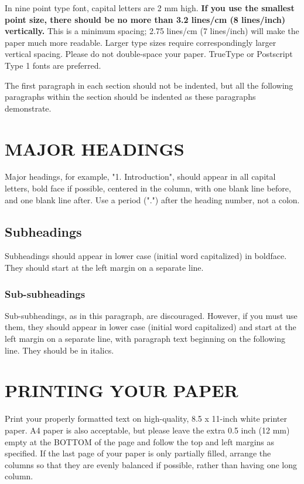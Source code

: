 \documentclass{article}
\begin{document}
In nine point type font, capital letters are 2 mm high.  {\bf If you use the
smallest point size, there should be no more than 3.2 lines/cm (8 lines/inch)
vertically.}  This is a minimum spacing; 2.75 lines/cm (7 lines/inch) will make
the paper much more readable.  Larger type sizes require correspondingly larger
vertical spacing.  Please do not double-space your paper.  TrueType or
Postscript Type 1 fonts are preferred.

The first paragraph in each section should not be indented, but all the
following paragraphs within the section should be indented as these paragraphs
demonstrate.

\section{MAJOR HEADINGS}
\label{sec:majhead}

Major headings, for example, "1. Introduction", should appear in all capital
letters, bold face if possible, centered in the column, with one blank line
before, and one blank line after. Use a period (".") after the heading number,
not a colon.

\subsection{Subheadings}
\label{ssec:subhead}

Subheadings should appear in lower case (initial word capitalized) in
boldface.  They should start at the left margin on a separate line.
 
\subsubsection{Sub-subheadings}
\label{sssec:subsubhead}

Sub-subheadings, as in this paragraph, are discouraged. However, if you
must use them, they should appear in lower case (initial word
capitalized) and start at the left margin on a separate line, with paragraph
text beginning on the following line.  They should be in italics.

\section{PRINTING YOUR PAPER}
\label{sec:print}

Print your properly formatted text on high-quality, 8.5 x 11-inch white printer
paper. A4 paper is also acceptable, but please leave the extra 0.5 inch (12 mm)
empty at the BOTTOM of the page and follow the top and left margins as
specified.  If the last page of your paper is only partially filled, arrange
the columns so that they are evenly balanced if possible, rather than having
one long column.
\end{document}
